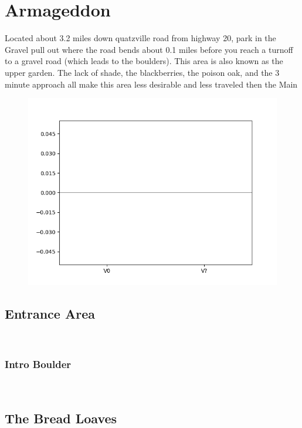 \chapter{Armageddon}\label{a:Armageddon}
\lhead{\textcolor{\chapterColor}{\rule[-2pt]{\textwidth}{15pt}}}
Located about 3.2 miles down quatzville road from highway 20, park in the Gravel pull out where the road bends about 0.1 miles before you reach a turnoff to a gravel road (which leads to the boulders). This area is also known as the upper garden. The lack of shade, the blackberries, the poison oak, and the 3 minute approach all make this area less desirable and less traveled then the Main
\begin{figure}[h]
  \centering
    \includegraphics[width=\linewidth]{./maps/plots/Armageddon.png}
\end{figure}

\section{Entrance Area}\label{sa:Entrance Area}
\
\subsection*{Intro Boulder}\label{bf:Intro Boulder}
\

\section{The Bread Loaves}\label{sa:The Bread Loaves}
\
